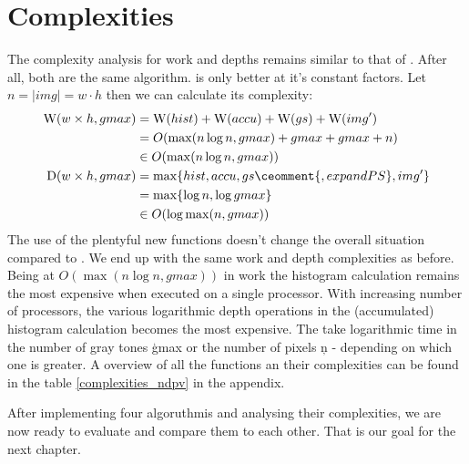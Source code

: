 \section{Complexities}
  The complexity analysis for work and depths remains similar to that of \ndpn.
  After all, both are the same algorithm. \ndpv is only better at it's constant factors.
  Let $n = |img| = w\cdot h$ then we can calculate its complexity:
  \begin{equation}
  \begin{split}
  \W(w \times h,gmax)
        & = \W(hist) + \W(accu) + \W(gs) + \comment{\W(expandPS) +} \W(img') \\
        & = O( \max(n \log n, gmax) + gmax + gmax \comment{ + 1} + n) \\
        & \in O(\max(n \log n, gmax)) \\
  \D(w \times h,gmax)
      & = \max \{ hist, accu, gs\ceomment{, expandPS}, img'\} \\
      & = \max \{\log n, \log gmax \} \\
      & \in O(\log \max(n,gmax)) \\
  \end{split}
  \end{equation}
  The use of the plentyful new functions doesn't change the overall situation compared to \ndpn.
  We end up with the same work and depth complexities as before. Being at $O(\max(n \log n,gmax))$ in work
  the histogram calculation remains the most expensive when executed on a single processor.
  With increasing number of processors, the various logarithmic depth
  operations in the (accumulated) histogram calculation becomes the most expensive.
  The take logarithmic time in the number of gray tones \c{gmax} or the number
  of pixels \c{n} - depending on which one is greater.
  A overview of all the functions an their complexities can be found in the table \ref{complexities_ndpv} in the appendix.
  
  After implementing four algoruthmis and analysing their complexities, we are now ready
  to evaluate and compare them to each other. That is our goal for the next chapter.
  
  
  
  
